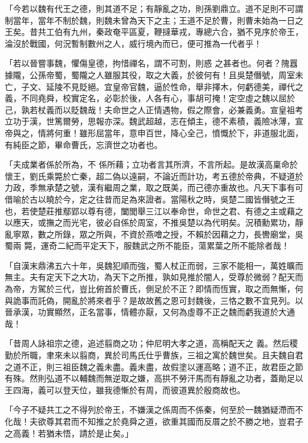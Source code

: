\begin{pinyinscope}
 「今若以魏有代王之德，則其道不足；有靜亂之功，則孫劉鼎立。道不足則不可謂制當年，當年不制於魏，則魏未曾為天下之主；王道不足於曹，則曹未始為一日之王矣。昔共工伯有九州，秦政奄平區夏，鞭撻華戎，專總六合，猶不見序於帝王，淪沒於戰國，何況暫制數州之人，威行境內而已，便可推為一代者乎！



 「若以晉嘗事魏，懼傷皇德，拘惜禪名，謂不可割，則惑
 之甚者也。何者？隗囂據隴，公孫帝蜀，蜀隴之人雖服其役，取之大義，於彼何有！且吳楚僭號，周室未亡，子文、延陵不見貶絕。宜皇帝官魏，逼於性命，舉非擇木，何虧德美，禪代之義，不同堯舜，校實定名，必彰於後，人各有心，事胡可掩！定空虛之魏以屈於己，孰若杖義而以貶魏哉！夫命世之人正情遇物，假之際會，必兼義勇。宣皇祖考立功于漢，世篤爾勞，思報亦深。魏武超越，志在傾主，德不素積，義險冰薄，宣帝與之，情將何重！雖形屈當年，意申百世，降心全己，憤慨於下，非道服北面，有純臣之節，畢命曹氏，忘濟世之功者也。



 「夫成業者係於所為，不
 係所藉；立功者言其所濟，不言所起。是故漢高稟命於懷王，劉氏乘斃於亡秦，超二偽以遠嗣，不論近而計功，考五德於帝典，不疑道於力政，季無承楚之號，漢有繼周之業，取之既美，而己德亦重故也。凡天下事有可借喻於古以曉於今，定之往昔而足為來證者。當陽秋之時，吳楚二國皆僭號之王也，若使楚莊推鄢郢以尊有德，闔閭舉三江以奉命世，命世之君、有德之主或藉之以應天，或撫之而光宅，彼必自係於周室，不推吳楚以為代明矣。況積勳累功，靜亂寧眾，數之所錄，眾之所與，不資於燕噲之授，不賴於因藉之力，長轡廟堂，吳蜀兩
 斃，運奇二紀而平定天下，服魏武之所不能臣，蕩累葉之所不能除者哉！



 「自漢末鼎沸五六十年，吳魏犯順而強，蜀人杖正而弱，三家不能相一，萬姓曠而無主。夫有定天下之大功，為天下之所推，孰如見推於闇人，受尊於微弱？配天而為帝，方駕於三代，豈比俯首於曹氏，側足於不正？即情而恆實，取之而無慚，何與詭事而託偽，開亂於將來者乎？是故故舊之恩可封魏後，三恪之數不宜見列。以晉承漢，功實顯然，正名當事，情體亦厭，又何為虛尊不正之魏而虧我道於大通哉！



 「昔周人詠祖宗之德，追述翦商之功；仲尼明大孝之道，高稱配天之
 義。然后稷勤於所職，聿來未以翦商，異於司馬氏仕乎曹族，三祖之寓於魏世矣。且夫魏自君之道不正，則三祖臣魏之義未盡。義未盡，故假塗以運高略；道不正，故君臣之節有殊。然則弘道不以輔魏而無逆取之嫌，高拱不勞汗馬而有靜亂之功者，蓋勛足以王四海，義可以登天位，雖我德慚於有周，而彼道異於殷商故也。



 「今子不疑共工之不得列於帝王，不嫌漢之係周而不係秦，何至於一魏猶疑滯而不化哉！夫欲尊其君而不知推之於堯舜之道，欲重其國而反厝之於不勝之地，豈君子之高義！若猶未悟，請於是止矣。」




\end{pinyinscope}
